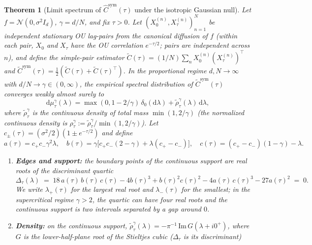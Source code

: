 \documentclass{article}
\newtheorem{theorem}{Theorem}
\begin{document}
\begin{theorem}[Limit spectrum of $\hat C^{\mathrm{sym}}(\tau)$ under the isotropic Gaussian null]
\label{thm:limit-spectrum}
Let $f = \mathcal{N}(0,\sigma^2 I_d)$, $\gamma = d/N$, and fix $\tau > 0$. Let $(X_0^{(n)}, X_\tau^{(n)})_{n=1}^N$ be independent stationary OU lag-pairs from the canonical diffusion of $f$ (within each pair, $X_0$ and $X_\tau$ have the OU correlation $e^{-\tau/2}$; pairs are independent across $n$), and define the simple-pair estimator $\widetilde C(\tau) = (1/N) \sum_n X_0^{(n)}(X_\tau^{(n)})^\top$ and $\widetilde C^{\mathrm{sym}}(\tau) = \tfrac12(\widetilde C(\tau) + \widetilde C(\tau)^\top)$. In the proportional regime $d, N \to \infty$ with $d/N \to \gamma \in (0, \infty)$, the empirical spectral distribution of $\widetilde C^{\mathrm{sym}}(\tau)$ converges weakly almost surely to
\begin{equation}
\mathrm{d}\mu_\tau^\gamma(\lambda) = \max(0, 1 - 2/\gamma)\,\delta_0(\mathrm{d}\lambda) + \tilde\rho_\tau^\gamma(\lambda)\,\mathrm{d}\lambda,
\label{eq:mu_tau_decomp}
\end{equation}
where $\tilde\rho_\tau^\gamma$ is the continuous density of total mass $\min(1, 2/\gamma)$ (the normalized continuous density is $\rho_\tau^\gamma := \tilde\rho_\tau^\gamma / \min(1, 2/\gamma)$). Let $c_\pm(\tau) = (\sigma^2/2)(1 \pm e^{-\tau/2})$ and define
\begin{equation}
a(\tau) = c_+ c_- \gamma^2 \lambda, \quad b(\tau) = \gamma\bigl[c_+ c_- (2-\gamma) + \lambda(c_+ - c_-)\bigr], \quad c(\tau) = (c_+ - c_-)(1 - \gamma) - \lambda.
\label{eq:abc-coefficients}
\end{equation}
\begin{enumerate}[label=(\roman*),leftmargin=*,nosep]
\item \textbf{Edges and support:} the boundary points of the continuous support are real roots of the discriminant quartic
\begin{equation}
\Delta_\tau(\lambda) \;=\; 18\,a(\tau)\,b(\tau)\,c(\tau) - 4 b(\tau)^3 + b(\tau)^2 c(\tau)^2 - 4 a(\tau)\, c(\tau)^3 - 27 a(\tau)^2 \;=\; 0.
\label{eq:edge-quartic}
\end{equation}
We write $\lambda_+(\tau)$ for the largest real root and $\lambda_-(\tau)$ for the smallest; in the supercritical regime $\gamma > 2$, the quartic can have four real roots and the continuous support is two intervals separated by a gap around $0$.
\item \textbf{Density:} on the continuous support, $\tilde\rho_\tau^\gamma(\lambda) = -\pi^{-1}\,\mathrm{Im}\,G(\lambda+i0^+)$, where $G$ is the lower-half-plane root of the Stieltjes cubic ($\Delta_\tau$ is its discriminant)

\end{enumerate}
\end{theorem}
\end{document}
